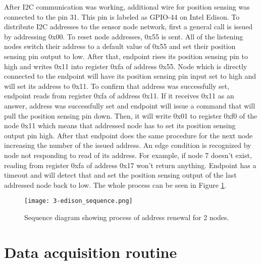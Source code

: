 After \ac{I2C} communication was working, additional wire for position sensing was connected to the pin 31. This pin is labeled as GPIO-44 on Intel Edison. To distribute \ac{I2C} addresses to the sensor node network, first a general call is issued by addressing 0x00. To reset node addresses, 0x55 is sent. All of the listening nodes switch their address to a default value of 0x55 and set their position sensing pin output to low. After that, endpoint rises its position sensing pin to high and writes 0x11 into register 0xfa of address 0x55. Node which is directly connected to the endpoint will have its position sensing pin input set to high and will set its address to 0x11. To confirm that address was successfully set, endpoint reads from register 0xfa of address 0x11. If it receives 0x11 as an answer, address was successfully set and endpoint will issue a command that will pull the position sensing pin down. Then, it will write 0x01 to register 0xf0 of the node 0x11 which means that addressed node has to set its position sensing output pin high. After that endpoint does the same procedure for the next node increasing the number of the issued address. An edge condition is recognized by node not responding to read of its address. For example, if node 7 doesn't exist, reading from register 0xfa of address 0x17 won't return anything. Endpoint has a timeout and will detect that and set the position sensing output of the last addressed node back to low. The whole process can be seen in Figure \ref{fig:endpoint_sequence}.

\begin{figure}[h]
  \begin{center}
    \texttt{[image: 3-edison\_sequence.png]}
  \end{center}
  \caption{Sequence diagram showing process of address renewal for 2 nodes.}
  \label{fig:endpoint_sequence}
\end{figure}


\section{Data acquisition routine}

